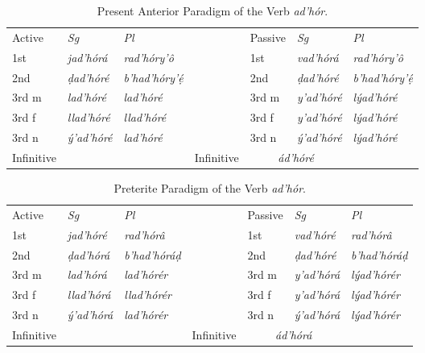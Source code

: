 \documentclass[a4paper, 12pt, oneside, final]{article}
\let \nf \normalfont
\begin{document}
\begin{table}[h]
\centering
\noindent\begin{tabular}{@{}|>{}l|>{\it}l|>{\it}l|>{}l|>{}l|>{\it}l|>{\it}l|}\cline{1-3}\cline{5-7}
\nf Active & \nf Sg   & \nf Pl     & \nf & \nf Passive & \nf Sg   & \nf Pl    \\\cline{1-3}\cline{5-7}
1st        & jad’hórá  & rad’hóry’ô     &     & 1st     & vad’hórá  & rad’hóry’ô   \\\cline{1-3}\cline{5-7}
2nd        & ḍad’hóré  & b’had’hóry’ẹ́  &     & 2nd      & ḍad’hóré  & b’had’hóry’ẹ́ \\\cline{1-3}\cline{5-7}
3rd m      & lad’hóré  & lad’hóré    &     & 3rd m      & y’ad’hóré & lýad’hóré  \\\cline{1-3}\cline{5-7}
3rd f      & llad’hóré & llad’hóré   &     & 3rd f      & y’ad’hóré & lýad’hóré  \\\cline{1-3}\cline{5-7}
3rd n      & ý’ad’hóré & lad’hóré   &     & 3rd n       & ý’ad’hóré & lýad’hóré  \\\cline{1-3}\cline{5-7}
Infinitive & \multicolumn{2}{c|}{\it dad’hórá} & & Infinitive & \multicolumn{2}{c|}{\it ád’hóré} \\\cline{1-3}\cline{5-7}
\end{tabular}
\caption{Present Anterior Paradigm of the Verb \emph{ad’hór}.}\label{tab:adhor-paradigm-pres}
\end{table}

\begin{table}[h]
\centering
\noindent\begin{tabular}{@{}|>{}l|>{\it}l|>{\it}l|>{}l|>{}l|>{\it}l|>{\it}l|}\cline{1-3}\cline{5-7}
\nf Active & \nf Sg   & \nf Pl     & \nf & \nf Passive & \nf Sg   & \nf Pl    \\\cline{1-3}\cline{5-7}
1st        & jad’hóré  & rad’hórâ     &     & 1st         & vad’hóré  & rad’hórâ   \\\cline{1-3}\cline{5-7}
2nd        & ḍad’hórá  & b’had’hóráḍ  &     & 2nd         & ḍad’hóré  & b’had’hóráḍ \\\cline{1-3}\cline{5-7}
3rd m      & lad’hórá  & lad’hórér    &     & 3rd m       & y’ad’hórá & lýad’hórér  \\\cline{1-3}\cline{5-7}
3rd f      & llad’hórá & llad’hórér   &     & 3rd f       & y’ad’hórá & lýad’hórér  \\\cline{1-3}\cline{5-7}
3rd n      & ý’ad’hórá & lad’hórér    &     & 3rd n       & ý’ad’hórá & lýad’hórér  \\\cline{1-3}\cline{5-7}
Infinitive & \multicolumn{2}{c|}{\it dad’hórá} & & Infinitive & \multicolumn{2}{c|}{\it ád’hórá} \\\cline{1-3}\cline{5-7}
\end{tabular}
\caption{Preterite Paradigm of the Verb \emph{ad’hór}.}\label{tab:adhor-paradigm-pret}
\end{table}
\end{document}
